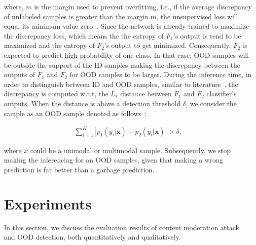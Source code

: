 \hspace*{3.5mm} where, $m$ is the margin used to prevent overfitting, i.e., if the average discrepancy of unlabeled samples is greater than the margin m, the unsupervised loss will equal its minimum value zero~\cite{yu2019unsupervised}. Since the network is already trained to maximize the discrepancy loss, which means the the entropy of $F_1$’s output is tend to be maximized and the entropy of $F_2$’s output to get minimized. Consequently, $F_2$ is expected to predict high probability of one class. In that case, OOD samples will be outside the support of the ID samples making the discrepancy between the outputs of $F_{1}$ and $F_{2}$ for OOD samples to be larger. During the inference time, in order to distinguish between ID and OOD samples, similar to literature~\cite{yu2019unsupervised}, the discrepancy is computed w.r.t, the $L_1$ distance between $F_{1}$ and $F_{2}$ classifier's outputs. When the distance is above a detection threshold $\delta$, we consider the sample as an OOD sample denoted as follows~\cite{yu2019unsupervised}: 

\vspace{-6mm}
\begin{align}
    \sum_{i=1}^{K}\left|p_{1}\left(y_{i} | \mathbf{x}\right)-p_{2}\left(y_{i} | \mathbf{x}\right)\right|>\delta, 
\end{align}

where $x$ could be a unimodal or multimodal sample. Subsequently, we stop making the inferencing for an OOD samples, given that making a wrong prediction is far better than a garbage prediction. 
\section{Experiments}\label{chapter_6:results} 
In this section, we discuss the evaluation results of content moderation attack and OOD detection, both quantitatively and qualitatively. %

